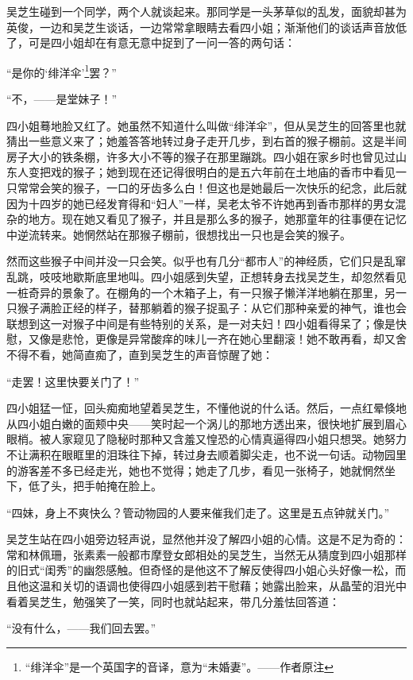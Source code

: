 \par 吴芝生碰到一个同学，两个人就谈起来。那同学是一头茅草似的乱发，面貌却甚为英俊，一边和吴芝生谈话，一边常常拿眼睛去看四小姐；渐渐他们的谈话声音放低了，可是四小姐却在有意无意中捉到了一问一答的两句话：
\par “是你的‘绯洋伞’\footnote{“绯洋伞”是一个英国字的音译，意为“未婚妻”。——作者原注}罢？”
\par “不，——是堂妹子！”
\par 四小姐蓦地脸又红了。她虽然不知道什么叫做“绯洋伞”，但从吴芝生的回答里也就猜出一些意义来了；她羞答答地转过身子走开几步，到右首的猴子棚前。这是半间房子大小的铁条棚，许多大小不等的猴子在那里蹦跳。四小姐在家乡时也曾见过山东人变把戏的猴子；她到现在还记得很明白的是五六年前在土地庙的香市中看见一只常常会笑的猴子，一口的牙齿多么白！但这也是她最后一次快乐的纪念，此后就因为十四岁的她已经发育得和“妇人”一样，吴老太爷不许她再到香市那样的男女混杂的地方。现在她又看见了猴子，并且是那么多的猴子，她那童年的往事便在记忆中逆流转来。她惘然站在那猴子棚前，很想找出一只也是会笑的猴子。
\par 然而这些猴子中间并没一只会笑。似乎也有几分“都市人”的神经质，它们只是乱窜乱跳，吱吱地歇斯底里地叫。四小姐感到失望，正想转身去找吴芝生，却忽然看见一桩奇异的景象了。在棚角的一个木箱子上，有一只猴子懒洋洋地躺在那里，另一只猴子满脸正经的样子，替那躺着的猴子捉虱子：从它们那种亲爱的神气，谁也会联想到这一对猴子中间是有些特别的关系，是一对夫妇！四小姐看得呆了；像是快慰，又像是悲怆，更像是异常酸痒的味儿一齐在她心里翻滚！她不敢再看，却又舍不得不看，她简直痴了，直到吴芝生的声音惊醒了她：
\par “走罢！这里快要关门了！”
\par 四小姐猛一怔，回头痴痴地望着吴芝生，不懂他说的什么话。然后，一点红晕倏地从四小姐白嫩的面颊中央——笑时起一个涡儿的那地方透出来，很快地扩展到眉心眼梢。被人家窥见了隐秘时那种又含羞又惶恐的心情真逼得四小姐只想哭。她努力不让满积在眼眶里的泪珠往下掉，转过身去顺着脚尖走，也不说一句话。动物园里的游客差不多已经走光，她也不觉得；她走了几步，看见一张椅子，她就惘然坐下，低了头，把手帕掩在脸上。
\par “四妹，身上不爽快么？管动物园的人要来催我们走了。这里是五点钟就关门。”
\par 吴芝生站在四小姐旁边轻声说，显然他并没了解四小姐的心情。这是不足为奇的：常和林佩珊，张素素一般都市摩登女郎相处的吴芝生，当然无从猜度到四小姐那样的旧式“闺秀”的幽怨感触。但奇怪的是他这不了解反使得四小姐心头好像一松，而且他这温和关切的语调也使得四小姐感到若干慰藉；她露出脸来，从晶莹的泪光中看着吴芝生，勉强笑了一笑，同时也就站起来，带几分羞怯回答道：
\par “没有什么，——我们回去罢。”

